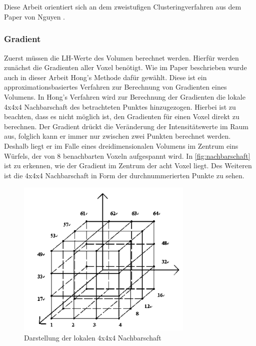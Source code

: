 \chapter{}
\label{sec:methods}


Diese Arbeit orientiert sich an dem zweistufigen Clusteringverfahren aus dem Paper von Nguyen \cite{nguyen2012clustering}. 

\subsection{Gradient}

Zuerst müssen die LH-Werte des Volumen berechnet werden. Hierfür werden zunächst die Gradienten aller Voxel benötigt. Wie im Paper beschrieben wurde auch in dieser Arbeit Hong's Methode \cite{hong2003method} dafür gewählt.
Diese ist ein approximationsbasiertes Verfahren zur Berechnung von Gradienten eines Volumens. 
\newline
In Hong's Verfahren wird zur Berechnung der Gradienten die lokale 4x4x4 Nachbarschaft des betrachteten Punktes hinzugezogen. Hierbei ist zu beachten, dass es nicht möglich ist, den Gradienten für einen Voxel direkt zu berechnen. Der Gradient drückt die Veränderung der Intensitätswerte im Raum aus, folglich kann er immer nur zwischen zwei Punkten berechnet werden. Deshalb liegt er im Falle eines dreidimensionalen Volumens im Zentrum eins Würfels, der von 8 benachbarten Voxeln aufgespannt wird. In \autoref{fig:nachbarschaft} ist zu erkennen, wie der Gradient im Zentrum der acht Voxel liegt. Des Weiteren ist die 4x4x4 Nachbarschaft in Form der durchnummerierten Punkte zu sehen.
\newline

\begin{figure}[!h] 
\centering 
\includegraphics[width=0.75\textwidth]{Logos/VoxelEdges.PNG}
\caption{Darstellung der lokalen 4x4x4 Nachbarschaft} 
\label{fig:nachbarschaft} 
\end{figure}

